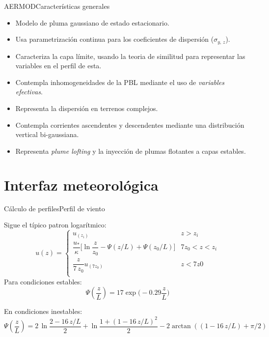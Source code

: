 \begin{frame}{AERMOD}{Características generales}
    
    \begin{itemize}
        \item Modelo de pluma gaussiano de estado estacionario.
        \item Usa parametrización continua para los coeficientes de dispersión ($\sigma_{y,\,z}$).
        \item Caracteriza la capa límite, usando la teoria de similitud para representar las variables en el perfil de esta.
        \item Contempla inhomogeneidades de la PBL mediante el uso de \textit{variables efectivas}.
        \item Representa la dispersión en terrenos complejos.
        \item Contempla corrientes ascendentes y descendentes mediante una distribución vertical bi-gaussiana.
        \item Representa \textit{plume lofting} y la inyección de plumas flotantes a capas estables.
    \end{itemize}
\end{frame} 

\section{Interfaz meteorológica}
\begin{frame}{Cálculo de perfiles}{Perfil de viento}

Sigue el típico patron logarítmico:
$$
u(z) = \begin{cases}
    u_(z_i) & z > z_i  \\
     \dfrac{u_*}{\kappa} \bigg[ \ln{\dfrac{z}{z_0}} - \Psi(z/L) + \Psi(z_0/L )\bigg]&  7z_0 < z < z_i\\[0.8em]
    \dfrac{z}{7\,z_0}u_{(7z_0)} & z < 7z0  \\[0.8em]
\end{cases}
$$
Para condiciones \alert{estables}:
$$ 
\Psi(\frac{z}{L}) = 17 \exp\bigg(-0.29\dfrac{z}{L}\bigg)
$$
 
 En condiciones \alert{inestables}:
 $$
 \Psi( \frac{z}{L}) =  2\,\ln \frac{2 - 16\,z/ L}{2} + \ln \frac{1+(1 - 16\,z/L)^2}{2} - 2 \arctan( (1 - 16\,z / L) + \pi/2 )
 $$
   
\end{frame}

